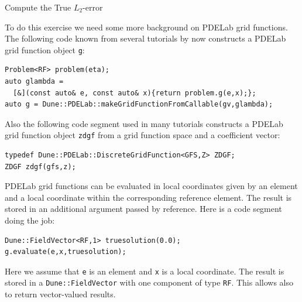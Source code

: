\documentclass[12pt,a4paper]{article}
\begin{document}
\begin{Exercise}{Compute the True $L_2$-error}

To do this exercise we need some more background on PDELab grid functions.
The following code known from several tutorials by now
constructs a PDELab grid function object \lstinline{g}:
\begin{lstlisting}[basicstyle=\ttfamily\small,
frame=single,
backgroundcolor=\color{listingbg}]
Problem<RF> problem(eta);
auto glambda =
  [&](const auto& e, const auto& x){return problem.g(e,x);};
auto g = Dune::PDELab::makeGridFunctionFromCallable(gv,glambda);
\end{lstlisting}
Also the following code segment used in many tutorials constructs
a PDELab grid function object \lstinline{zdgf} from a grid function space and
a coefficient vector:
\begin{lstlisting}[basicstyle=\ttfamily\small,
frame=single,
backgroundcolor=\color{listingbg}]
typedef Dune::PDELab::DiscreteGridFunction<GFS,Z> ZDGF;
ZDGF zdgf(gfs,z);
\end{lstlisting}
PDELab grid functions can be evaluated in local coordinates given by an
element and a local coordinate within the corresponding reference element.
The result is stored in an additional argument passed by reference.
Here is a code segment doing the job:
\begin{lstlisting}[basicstyle=\ttfamily\small,
frame=single,
backgroundcolor=\color{listingbg}]
Dune::FieldVector<RF,1> truesolution(0.0);
g.evaluate(e,x,truesolution);
\end{lstlisting}
Here we assume that \lstinline{e} is an element and \lstinline{x} is a local coordinate.
The result is stored in a \lstinline{Dune::FieldVector} with one component of type
\lstinline{RF}. This allows also to return vector-valued results.


\end{Exercise}
\end{document}
